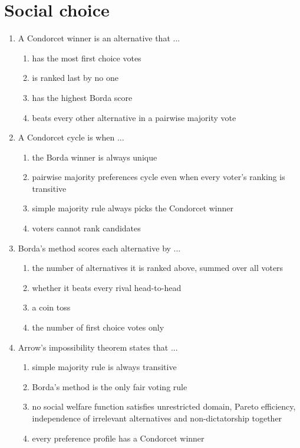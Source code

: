 \documentclass[11pt]{article}
\begin{document}
\section*{Social choice}
\begin{enumerate}[itemsep=6pt]
  \item A Condorcet winner is an alternative that ...
  \begin{enumerate}
    \item has the most first choice votes
    \item is ranked last by no one
    \item has the highest Borda score
    \item beats every other alternative in a pairwise majority vote
  \end{enumerate}
  \item A Condorcet cycle is when ...
  \begin{enumerate}
    \item the Borda winner is always unique
    \item pairwise majority preferences cycle even when every voter's ranking is transitive
    \item simple majority rule always picks the Condorcet winner
    \item voters cannot rank candidates
  \end{enumerate}
  \item Borda's method scores each alternative by ...
  \begin{enumerate}
    \item the number of alternatives it is ranked above, summed over all voters
    \item whether it beats every rival head-to-head
    \item a coin toss
    \item the number of first choice votes only
  \end{enumerate}
  \item Arrow's impossibility theorem states that ...
  \begin{enumerate}
    \item simple majority rule is always transitive
    \item Borda's method is the only fair voting rule
    \item no social welfare function satisfies unrestricted domain, Pareto efficiency, independence of irrelevant alternatives and non-dictatorship together
    \item every preference profile has a Condorcet winner

\end{enumerate}
\end{enumerate}
\end{document}
